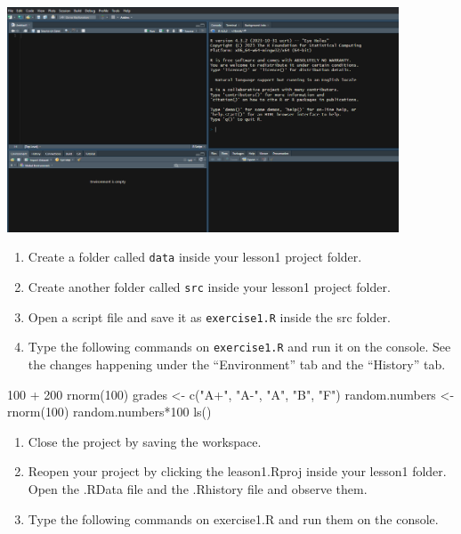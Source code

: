 \documentclass[
  letterpaper,
  DIV=11,
  numbers=noendperiod]{scrreprt}
\newenvironment{Shaded}{\begin{snugshade}}{\end{snugshade}}
\newcommand{\DecValTok}[1]{\textcolor[rgb]{0.68,0.00,0.00}{#1}}
\newcommand{\FunctionTok}[1]{\textcolor[rgb]{0.28,0.35,0.67}{#1}}
\newcommand{\NormalTok}[1]{\textcolor[rgb]{0.00,0.23,0.31}{#1}}
\newcommand{\OtherTok}[1]{\textcolor[rgb]{0.00,0.23,0.31}{#1}}
\newcommand{\SpecialCharTok}[1]{\textcolor[rgb]{0.37,0.37,0.37}{#1}}
\newcommand{\StringTok}[1]{\textcolor[rgb]{0.13,0.47,0.30}{#1}}
\begin{document}
\includegraphics[width=4.58in,height=\textheight]{ch1.png}

\begin{enumerate}
\def\labelenumi{\arabic{enumi}.}
\setcounter{enumi}{3}
\item
  Create a folder called \texttt{data} inside your lesson1 project
  folder.
\item
  Create another folder called \texttt{src} inside your lesson1 project
  folder.
\item
  Open a script file and save it as \texttt{exercise1.R} inside the src
  folder.
\item
  Type the following commands on \texttt{exercise1.R} and run it on the
  console. See the changes happening under the ``Environment'' tab and
  the ``History'' tab.
\end{enumerate}

\begin{Shaded}
\begin{Highlighting}[]
\DecValTok{100} \SpecialCharTok{+} \DecValTok{200}
\FunctionTok{rnorm}\NormalTok{(}\DecValTok{100}\NormalTok{)}
\NormalTok{grades }\OtherTok{\textless{}{-}} \FunctionTok{c}\NormalTok{(}\StringTok{"A+"}\NormalTok{, }\StringTok{"A{-}"}\NormalTok{, }\StringTok{"A"}\NormalTok{, }\StringTok{"B"}\NormalTok{, }\StringTok{"F"}\NormalTok{)}
\NormalTok{random.numbers }\OtherTok{\textless{}{-}} \FunctionTok{rnorm}\NormalTok{(}\DecValTok{100}\NormalTok{)}
\NormalTok{random.numbers}\SpecialCharTok{*}\DecValTok{100}
\FunctionTok{ls}\NormalTok{()}
\end{Highlighting}
\end{Shaded}

\begin{enumerate}
\def\labelenumi{\arabic{enumi}.}
\setcounter{enumi}{7}
\item
  Close the project by saving the workspace.
\item
  Reopen your project by clicking the leason1.Rproj inside your lesson1
  folder. Open the .RData file and the .Rhistory file and observe them.
\item
  Type the following commands on exercise1.R and run them on the
  console.
\end{enumerate}
\end{document}
